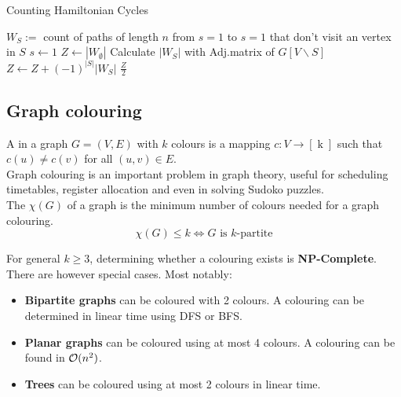 \documentclass[a3paper, landscape, 11pt]{article} %
\begin{document}
\begin{multicols*}{4}
\begin{algorithm}[H]
\caption{Counting Hamiltonian Cycles}
\begin{algorithmic}[1]
\vspace{3pt}
\Statex $W_S:=$ count of paths of length $n$ from $s=1$ to $s=1$ that don't visit an vertex in $S$
\vspace{5pt}
\State $s \gets 1$ 
\State $Z \gets |W_{\emptyset}|$ 
	\State Calculate $|W_S|$ with Adj.matrix of $G[V\backslash S]$
	\State $Z \gets Z + (-1)^{|S|} |W_S|$
\EndFor
\State
\Return $\tfrac{Z}{2}$ 
\EndProcedure
\end{algorithmic}
\end{algorithm}



\vfill %

\subsection*{Graph colouring}

A  in a graph $G=(V,E)$ with $k$ colours is a mapping $c: V \rightarrow [\operatorname{k}]$ such that $ c(u) \ne c(v) $ for all $(u,v)\in E$.\\

Graph colouring is an important problem in graph theory, useful for scheduling timetables, register allocation and even in solving Sudoko puzzles.\\

The  $\chi(G)$ of a graph is the minimum number of colours needed for a graph colouring. 
$$\chi(G) \le k \Longleftrightarrow \text{$G$ is $k$-partite} $$

For general $k\ge3$, determining whether a colouring exists is \textbf{NP-Complete}. There are however special cases. Most notably:
\begin{itemize}[label=$\diamond$]
	\item \textbf{Bipartite graphs} can be coloured with 2 colours. A colouring can be determined in linear time using DFS or BFS.
	\item \textbf{Planar graphs} can be coloured using at most 4 colours. A colouring can be found in  $\mathcal{O}(n^2)$.
	\item \textbf{Trees} can be coloured using at most 2 colours in linear time.
\end{itemize}


\end{multicols*}
\end{document}

